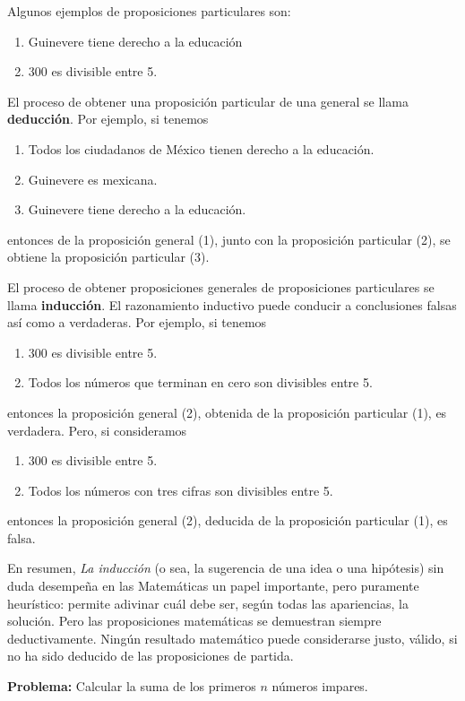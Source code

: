 \noindent Algunos ejemplos de proposiciones particulares son:
\begin{enumerate}
    \item Guinevere tiene derecho a la educación 
    \item 300 es divisible entre 5.
\end{enumerate}
El proceso de obtener una proposición particular de una general se llama \textbf{deducción}. Por ejemplo, si tenemos
\begin{enumerate}
    \item Todos los ciudadanos de México tienen derecho a la educación.
    \item Guinevere es mexicana.
    \item Guinevere tiene derecho a la educación.
\end{enumerate}
entonces de la proposición general (1), junto con la proposición particular (2), se obtiene la proposición particular (3).

El proceso de obtener proposiciones generales de proposiciones particulares se llama \textbf{inducción}. El razonamiento inductivo puede conducir a conclusiones falsas así como a verdaderas. Por ejemplo, si tenemos
\begin{enumerate}
    \item 300 es divisible entre 5.
    \item Todos los números que terminan en cero son divisibles entre 5.
\end{enumerate}
entonces la proposición general (2), obtenida de la proposición particular (1), es verdadera. Pero, si consideramos
\begin{enumerate}
    \item 300 es divisible entre 5.
    \item Todos los números con tres cifras son divisibles entre 5.
\end{enumerate}
entonces la proposición general (2), deducida de la proposición particular (1), es falsa.

En resumen, \emph{La inducción} (o sea, la sugerencia de una idea o una hipótesis) sin duda desempeña en las Matemáticas un papel importante, pero puramente heurístico: permite adivinar cuál debe ser, según todas las apariencias, la solución. Pero las proposiciones matemáticas se demuestran siempre deductivamente. Ningún resultado matemático puede considerarse justo, válido, si no ha sido deducido de las proposiciones de partida.

\noindent\textbf{\selectfont\color{black}Problema:\hspace{5pt plus 1pt minus 1pt}} Calcular la suma de los primeros $n$ números impares.

